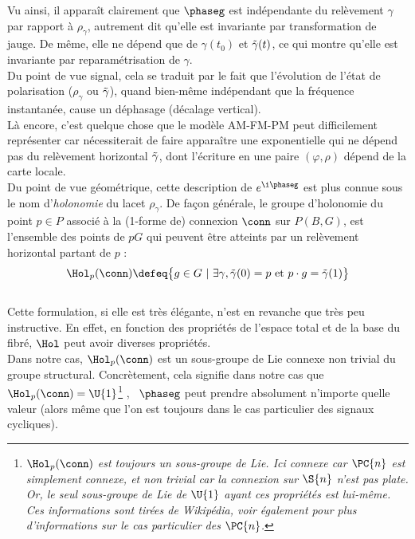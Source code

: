 \noindent Vu ainsi, il apparaît clairement que $\phaseg$ est indépendante du relèvement $\gamma$ par rapport à $\rho_\gamma$, autrement dit qu'elle est invariante par transformation de jauge. 
De même, elle ne dépend que de $\gamma(t_0)$ et $\Tilde{\gamma}(t)$, ce qui montre qu'elle est invariante par reparamétrisation de $\gamma$.
\\

Du point de vue signal, cela se traduit par le fait que l'évolution de l'état de polarisation ($\rho_\gamma$ ou $\Tilde{\gamma}$), quand bien-même indépendant que la fréquence instantanée, cause un déphasage (décalage vertical). \\
Là encore, c'est quelque chose que le modèle AM-FM-PM peut difficilement représenter car nécessiterait de faire apparaître une exponentielle qui ne dépend pas du relèvement horizontal $\Tilde{\gamma}$, dont l'écriture en une paire $(\varphi,\rho)$ dépend de la carte locale.
\\ 

Du point de vue géométrique, cette description de  $e^{\i \phaseg}$ est plus connue sous le nom d’\emph{holonomie} du lacet $\rho_\gamma$. De façon générale, le groupe d'holonomie du point $p\in P$ associé à la (1-forme de) connexion $\conn$ sur $P(B,G)$, est l'ensemble des points de $pG$ qui peuvent être atteints par un relèvement horizontal partant de $p$ :
\begin{equation} \label{eq:def2Hol}
\Hol_p(\conn) \defeq \big\{ g\in G\ |\ \exists \gamma, \Tilde{\gamma}(0) = p \text{ et } p\cdot g = \Tilde{\gamma}(1) \big\}
\end{equation}
\\
Cette formulation, si elle est très élégante, n'est en revanche que très peu instructive. En effet, en fonction des propriétés de l'espace total et de la base du fibré, $\Hol$ peut avoir diverses propriétés. 
\\
Dans notre cas, $\Hol_p(\conn)$ est un sous-groupe de Lie connexe non trivial du groupe structural. Concrètement, cela signifie dans notre cas que $\Hol_p(\conn)=\U{1}$\footnote{\itshape
$\Hol_p(\conn)$ est toujours un sous-groupe de Lie. Ici connexe car $\PC{n}$ est simplement connexe, et non trivial car la connexion sur $\S{n}$ n'est pas plate.  Or, le seul sous-groupe de Lie de $\U{1}$ ayant ces propriétés est lui-même. Ces informations sont tirées de Wikipédia, voir également \cite[sec. 8.5.3]{nakahara_geometry_2003} pour plus d'informations sur le cas particulier des $\PC{n}$.}
, \ie~$\phaseg$ peut prendre absolument n'importe quelle valeur (alors même que l'on est toujours dans le cas particulier des signaux cycliques).
\\



